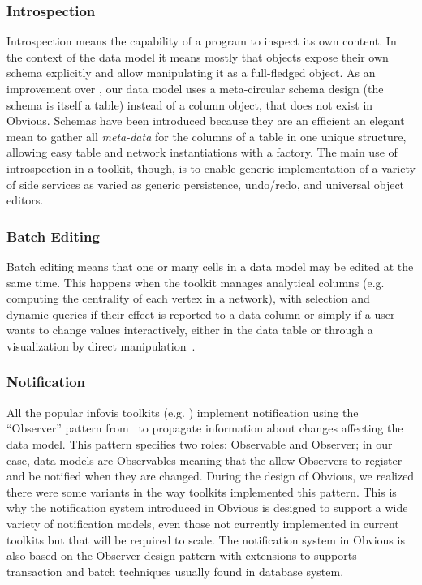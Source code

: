 \subsubsection{Introspection}

Introspection means the capability of a program to inspect its own
content. In the context of the data model it means mostly that objects
expose their own schema explicitly and allow manipulating it as a
full-fledged object.  As an improvement over \cite{DesignPatternsIV},
our data model uses a meta-circular schema design (the schema is
itself a table) instead of a column object, that does not exist in
Obvious.  Schemas have been introduced because they are an efficient
an elegant mean to gather all \emph{meta-data} for the columns of a
table in one unique structure, allowing easy table and network
instantiations with a factory.  The main use of introspection in a
toolkit, though, is to enable generic implementation of a variety of
side services as varied as generic persistence, undo/redo, and
universal object editors.

\subsubsection{Batch Editing}

Batch editing means that one or many cells in a data model may be
edited at the same time.  This happens when the toolkit manages
analytical columns (e.g. computing the centrality of each vertex in a
network), with selection and dynamic queries if their effect is
reported to a data column or simply if a user wants to change values
interactively, either in the data table or through a visualization by
direct manipulation~\cite{Discovery3}.

\subsubsection{Notification}

All the popular infovis toolkits
(e.g. \cite{Prefuse, InfoVis, jung2003, Discovery1}) implement
notification using the ``Observer'' pattern from~\cite{DesignPatterns}
to propagate information about changes affecting the data model.  This
pattern specifies two roles: Observable and Observer; in our case,
data models are Observables meaning that the allow Observers to
register and be notified when they are changed.  During the design of
Obvious, we realized there were some variants in the way toolkits
implemented this pattern.  This is why the notification system
introduced in Obvious is designed to support a wide variety of
notification models, even those not currently implemented in current
toolkits but that will be required to scale.  The notification system
in Obvious is also based on the Observer design pattern with
extensions to supports transaction and batch techniques usually found
in database system.

